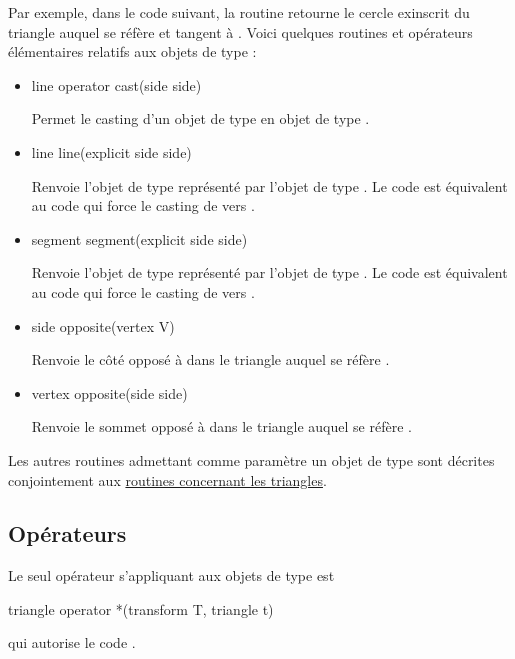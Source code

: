 \documentclass[pdftex]{article}
\begin{document}
Par exemple, dans le code suivant, la routine
\hypertarget{excircleside}{} retourne le
cercle exinscrit du triangle auquel se réfère  et tangent
à .
Voici quelques routines et opérateurs élémentaires relatifs aux
objets de type :
\begin{itemize}
\item {}
  \begin{Vcolor}
    line operator cast(side side)
  \end{Vcolor}
  Permet le \og{}casting\fg{} d'un objet de type  en
  objet de type .
\item {}
  \begin{Vcolor}
    line line(explicit side side)
  \end{Vcolor}
  Renvoie l'objet de type  représenté par
  l'objet  de type . Le code  est
  équivalent au code  qui force le \og{}casting\fg{} de
   vers .
\item {}
  \begin{Vcolor}
    segment segment(explicit side side)
  \end{Vcolor}
  Renvoie l'objet de type  représenté par
  l'objet  de type . Le code  est
  équivalent au code  qui force le \og{}casting\fg{} de
   vers .
\item {}
  \begin{Vcolor}
    side opposite(vertex V)
  \end{Vcolor}
  Renvoie le côté opposé à  dans le triangle auquel se réfère .
\item {}
  \begin{Vcolor}
    vertex opposite(side side)
  \end{Vcolor}
  Renvoie le sommet opposé à  dans le triangle auquel se réfère .
\end{itemize}
Les autres routines admettant comme paramètre un objet de type
 sont décrites conjointement aux
\href{#subsection.routines}{routines concernant les triangles}.

\subsection{Opérateurs}
Le seul opérateur s'appliquant aux objets de type  est
\begin{Vcolor}
  triangle operator *(transform T, triangle t)
\end{Vcolor}
\noindent qui autorise le code .
\end{document}
